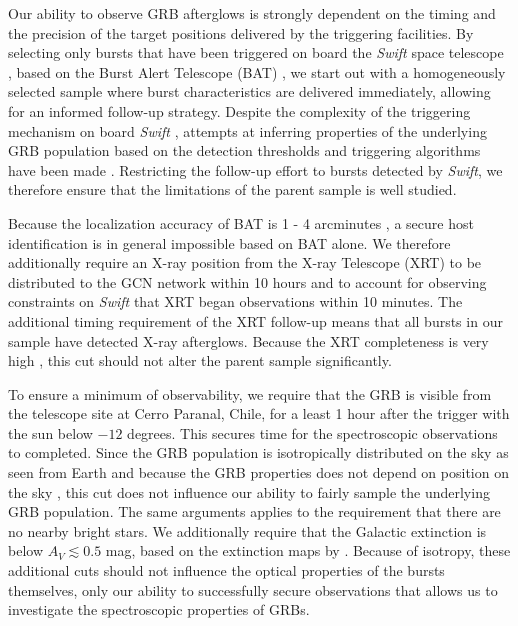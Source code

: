 \documentclass{aa}    %
\begin{document}
Our ability to observe GRB afterglows is strongly dependent on the timing and
the precision of the target positions delivered by the triggering facilities. By
selecting only bursts that have been triggered on board the \textit{Swift} space
telescope \citep{Gehrels2004}, based on the Burst Alert Telescope (BAT)
\citep{Barthelmy2005}, we  start out with a homogeneously selected sample where
burst characteristics are delivered immediately, allowing for an informed
follow-up strategy. Despite the complexity of the triggering mechanism on board
\textit{Swift} \citep{Band2006, Coward2013a}, attempts at inferring properties
of the underlying GRB population based on the detection thresholds and
triggering algorithms have been made \citep{Lien2014, Graff2016}. Restricting
the follow-up effort to bursts detected by \textit{Swift}, we therefore ensure
that the limitations of the parent sample is well studied.

Because the localization accuracy of BAT is 1 - 4 arcminutes
\citep{Barthelmy2005}, a secure host identification is in general impossible
based on BAT alone. We therefore additionally require an X-ray position from the
X-ray Telescope (XRT) \citep{Burrows2005} to be distributed to the GCN network
\citep{Barthelmy2000} within 10 hours and to account for observing constraints
on \textit{Swift} that XRT began observations within 10 minutes. The additional
timing requirement of the XRT follow-up means that all bursts in our sample have
detected X-ray afterglows. Because the XRT completeness is very high
\citep{Burrows2007}, this cut should not alter the parent sample significantly.

To ensure a minimum of observability, we require that the GRB is visible from
the telescope site at Cerro Paranal, Chile, for a least 1 hour after the trigger
with the sun below $-12$ degrees. This secures time for the spectroscopic
observations to completed. Since the GRB population is isotropically distributed
on the sky as seen from Earth and because the GRB properties does not depend on
position on the sky \citep{Briggs1996}, this cut does not influence our ability
to fairly sample the underlying GRB population. The same arguments applies to
the requirement that there are no nearby bright stars. We additionally require
that the Galactic extinction is below $A_V \lesssim 0.5$ mag, based on the
extinction maps by \citet{Schlegel1998}. Because of isotropy, these additional
cuts should not influence the optical properties of the bursts themselves, only
our ability to successfully secure observations that allows us to investigate
the spectroscopic properties of GRBs.
\end{document}

